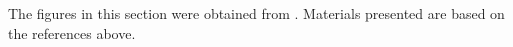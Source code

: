 \begin{refsection}
\printbibliography[heading=subbibliography]

The figures in this section were obtained from \cite{sesitivityAmpPaper2005}. Materials presented are based on the references above.

\end{refsection}
